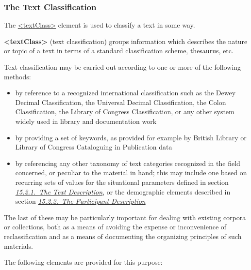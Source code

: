 \subsubsection[{The Text Classification}]{The Text Classification}\label{HD43}\par
The \hyperref[TEI.textClass]{<textClass>} element is used to classify a text in some way. 
\begin{sansreflist}
  
\item [\textbf{<textClass>}] (text classification) groups information which describes the nature or topic of a text in terms of a standard classification scheme, thesaurus, etc.
\end{sansreflist}
\par
Text classification may be carried out according to one or more of the following methods: \begin{itemize}
\item by reference to a recognized international classification such as the Dewey Decimal Classification, the Universal Decimal Classification, the Colon Classification, the Library of Congress Classification, or any other system widely used in library and documentation work
\item by providing a set of keywords, as provided for example by British Library or Library of Congress Cataloguing in Publication data
\item by referencing any other taxonomy of text categories recognized in the field concerned, or peculiar to the material in hand; this may include one based on recurring sets of values for the situational parameters defined in section \textit{\hyperref[CCAHTD]{15.2.1.\ The Text Description}}, or the demographic elements described in section \textit{\hyperref[CCAHPA]{15.2.2.\ The Participant Description}}
\end{itemize}  The last of these may be particularly important for dealing with existing corpora or collections, both as a means of avoiding the expense or inconvenience of reclassification and as a means of documenting the organizing principles of such materials.\par
The following elements are provided for this purpose: 
